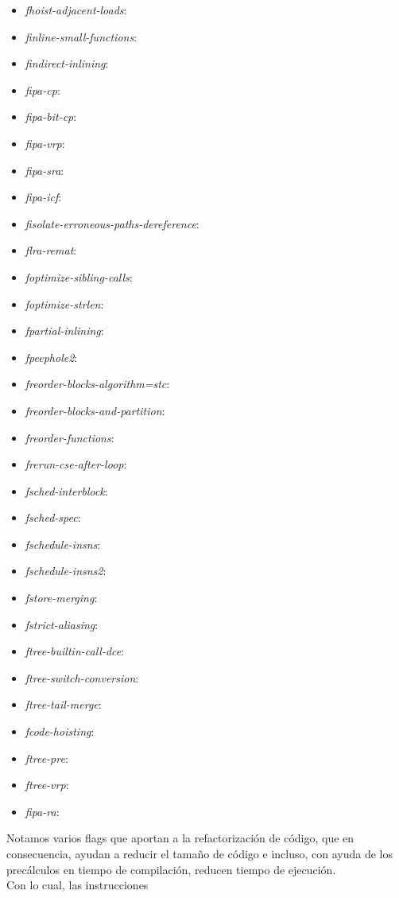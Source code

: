 \begin{itemize}
  \item \textit{fhoist-adjacent-loads}:
	\item \textit{finline-small-functions}:
	\item \textit{findirect-inlining}:
	\item \textit{fipa-cp}:
	\item \textit{fipa-bit-cp}:
	\item \textit{fipa-vrp}:
	\item \textit{fipa-sra}:
	\item \textit{fipa-icf}:
	\item \textit{fisolate-erroneous-paths-dereference}:
	\item \textit{flra-remat}:
	\item \textit{foptimize-sibling-calls}:
	\item \textit{foptimize-strlen}:
	\item \textit{fpartial-inlining}:
	\item \textit{fpeephole2}:
	\item \textit{freorder-blocks-algorithm=stc}:
	\item \textit{freorder-blocks-and-partition}:
	\item \textit{freorder-functions}:
	\item \textit{frerun-cse-after-loop}:
	\item \textit{fsched-interblock}:
	\item \textit{fsched-spec}:
	\item \textit{fschedule-insns}:
	\item \textit{fschedule-insns2}:
	\item \textit{fstore-merging}:
	\item \textit{fstrict-aliasing}:
	\item \textit{ftree-builtin-call-dce}:
	\item \textit{ftree-switch-conversion}:
	\item \textit{ftree-tail-merge}:
	\item \textit{fcode-hoisting}:
	\item \textit{ftree-pre}:
	\item \textit{ftree-vrp}:
	\item \textit{fipa-ra}:
\end{itemize}

Notamos varios flags que aportan a la refactorización de código, que en consecuencia, ayudan a reducir el tamaño de código e incluso, con ayuda de los precálculos en tiempo de compilación, reducen tiempo de ejecución.
~\\
Con lo cual, las instrucciones
~\\
~\\


